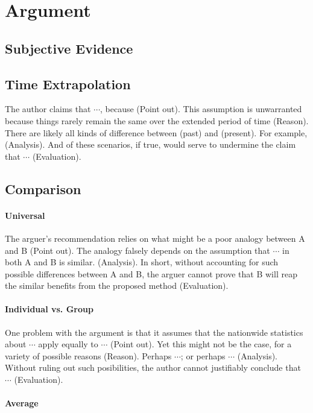 \section{Argument}

\subsection{Subjective Evidence}

\subsection{Time Extrapolation}
The author claims that \(\cdots\), because ({\color{red}Point out}).
This assumption is unwarranted because things rarely remain the same over the extended period of time ({\color{red}Reason}).
There are likely all kinds of difference between (past) and (present).
For example, ({\color{red}Analysis}).
And of these scenarios, if true, would serve to undermine the claim that \(\cdots\) ({\color{red}Evaluation}).

\subsection{Comparison}
\paragraph{Universal}
The arguer's recommendation relies on what might be a poor analogy between A and B ({\color{red}Point out}).
The analogy falsely depends on the assumption that \(\cdots\) in both A and B is similar.
({\color{red}Analysis}).
In short, without accounting for such possible differences between A and B, the arguer cannot prove that B will reap the similar benefits from the proposed method ({\color{red}Evaluation}).

\paragraph{Individual vs. Group}
One problem with the argument is that it assumes that the nationwide statistics about \(\cdots\) apply equally to \(\cdots\) ({\color{red}Point out}).
Yet this might not be the case, for a variety of possible reasons ({\color{red}Reason}).
Perhaps \(\cdots\); or perhaps \(\cdots\) ({\color{red}Analysis}).
Without ruling out such posibilities, the author cannot justifiably conclude that \(\cdots\) ({\color{red}Evaluation}).

\paragraph{Average}



